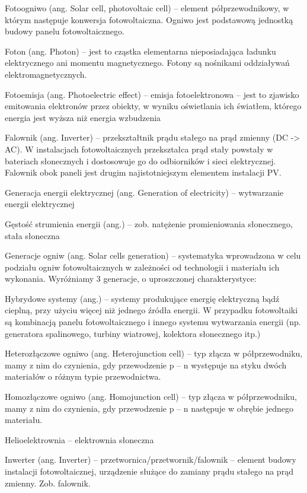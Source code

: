 \documentclass[12pt,a4paper]{article}
\begin{document}
Fotoogniwo (ang. Solar cell, photovoltaic cell) – element półprzewodnikowy, w którym następuje konwersja fotowoltaiczna. Ogniwo jest podstawową jednostką budowy panelu fotowoltaicznego.

Foton (ang. Photon) – jest to cząstka elementarna nieposiadająca ładunku elektrycznego ani momentu magnetycznego. Fotony są nośnikami oddziaływań elektromagnetycznych.

Fotoemisja (ang. Photoelectric effect) – emisja fotoelektronowa – jest to zjawisko emitowania elektronów przez obiekty, w wyniku oświetlania ich światłem, którego energia jest wyższa niż energia wzbudzenia

Falownik (ang. Inverter) – przekształtnik prądu stałego na prąd zmienny (DC -> AC). W instalacjach fotowoltaicznych przekształca prąd stały powstały w bateriach słonecznych i dostosowuje go do odbiorników i sieci elektrycznej. Falownik obok paneli jest drugim najistotniejszym elementem instalacji PV.

Generacja energii elektrycznej (ang. Generation of electricity) – wytwarzanie energii elektrycznej

Gęstość strumienia energii (ang.) – zob. natężenie promieniowania słonecznego, stała słoneczna

Generacje ogniw (ang. Solar cells generation) – systematyka wprowadzona w celu podziału ogniw fotowoltaicznych w zależności od technologii i materiału ich  wykonania. Wyróżniamy 3 generacje, o uproszczonej charakterystyce:


Hybrydowe systemy (ang.) – systemy produkujące energię elektryczną bądź cieplną, przy użyciu więcej niż jednego źródła energii. W przypadku fotowoltaiki są kombinacją panelu fotowoltaicznego i innego systemu wytwarzania energii (np. generatora spalinowego, turbiny wiatrowej, kolektora słonecznego itp.)

Heterozłączowe ogniwo (ang. Heterojunction cell) – typ złącza w półprzewodniku, mamy z nim do czynienia, gdy przewodzenie p – n występuje na styku dwóch materiałów o różnym typie przewodnictwa.

Homozłączowe ogniwo (ang. Homojunction cell) – typ złącza w półprzewodniku, mamy z nim do czynienia, gdy przewodzenie p – n następuje w obrębie jednego materiału.

Helioelektrownia – elektrownia słoneczna


Inwerter (ang. Inverter) – przetwornica/przetwornik/falownik – element budowy instalacji fotowoltaicznej, urządzenie służące do zamiany prądu stałego na prąd zmienny. Zob. falownik.
\end{document}
